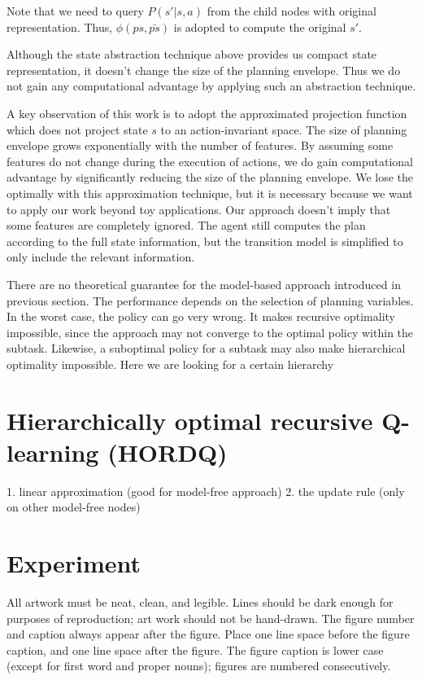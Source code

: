 \documentclass{article} %
\begin{document}
Note that we need to query $P(s'|s, a)$ from the child nodes with original representation.
Thus, $\phi(ps, \bar{ps})$ is adopted to compute the original $s'$.  

Although the state abstraction technique above provides us compact state representation, 
it doesn't change the size of the planning envelope. Thus we do not gain any computational
advantage by applying such an abstraction technique.

A key observation of this work is to adopt the approximated projection function which
does not project state $s$ to an action-invariant space.
The size of planning envelope grows exponentially with the number of features.
By assuming 
some features do not change during the execution of actions, we do gain computational advantage by
significantly reducing the size of the planning envelope. 
We lose the optimally with this approximation technique, but it is necessary because we want 
to apply our work beyond toy applications.
Our approach doesn't imply that
some features are completely ignored. The agent still computes the plan according to 
the full state information, but the transition model is simplified to only include the 
relevant information.

There are no theoretical guarantee for the model-based approach introduced in previous 
section. The performance depends on the selection of planning variables. In the worst
case, the policy can go very wrong. It makes recursive optimality impossible, since
the approach may not converge to the optimal policy within the subtask. Likewise,
a suboptimal policy for a subtask may also make hierarchical optimality impossible.
Here we are looking for a certain hierarchy  
\section{Hierarchically optimal recursive Q-learning (HORDQ)}
1. linear approximation (good for model-free approach)
2. the update rule (only on other model-free nodes)


\section{Experiment}

All artwork must be neat, clean, and legible. Lines should be dark
enough for purposes of reproduction; art work should not be
hand-drawn. The figure number and caption always appear after the
figure. Place one line space before the figure caption, and one line
space after the figure. The figure caption is lower case (except for
first word and proper nouns); figures are numbered consecutively.
\end{document}
